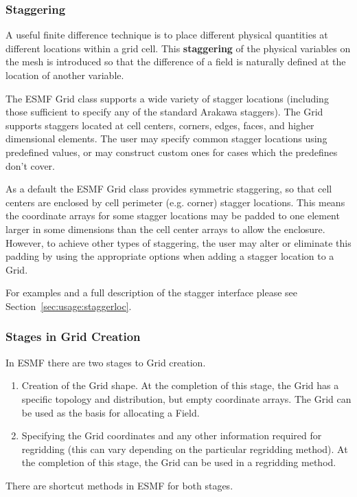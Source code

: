 \subsubsection{Staggering}

 A useful finite difference technique is to place different physical
quantities at different locations within a grid cell. This {\bf staggering}
of the physical variables on the mesh is introduced so that the difference
of a field is naturally defined at the location of another variable. 

The ESMF Grid class supports a wide variety of stagger locations (including
those sufficient to specify any of the standard Arakawa staggers). The 
Grid supports staggers located at cell centers, corners, edges, 
faces, and higher dimensional elements. The user may specify
common stagger locations using predefined values, or may construct
custom ones for cases which the predefines don't cover.

As a default the ESMF Grid class provides symmetric staggering, so
that cell centers are enclosed by cell perimeter (e.g. corner) 
stagger locations. This means the coordinate arrays for
some stagger locations may be padded to one element larger in some
dimensions than the cell center arrays to allow the enclosure. 
However, to achieve other types of staggering, the user may alter 
or eliminate this padding by using the appropriate options when adding
a stagger location to a Grid. 
 
For examples and a full description of the stagger interface 
please see Section~\ref{sec:usage:staggerloc}. 


\subsubsection{Stages in Grid Creation} 

In ESMF there are two stages to Grid creation.
\begin{enumerate}
\item Creation of the Grid shape.  At the completion of this
stage, the Grid has a specific topology and distribution, but
empty coordinate arrays.  The Grid can be used as the basis for
allocating a Field.
\item Specifying the Grid coordinates and any other information
required for regridding (this can vary depending on the 
particular regridding method).  At the completion of this
stage, the Grid can be used in a regridding method.
\end{enumerate}
There are shortcut methods in ESMF for both stages.

